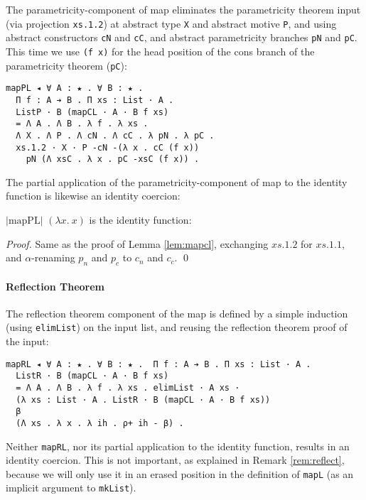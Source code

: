 \documentclass[a4paper,envcountsame,envcountsect]{llncs}
\newcommand{\refrem}[1]{Remark \ref{rem:#1}}
\newcommand{\reflem}[1]{Lemma \ref{lem:#1}}
\newcommand{\lablem}[1]{\label{lem:#1}}
\newcommand{\earg}[1]{\,\,#1}
\newcommand{\erase}[1]{\ensuremath{\lvert #1 \rvert}}
\newcommand{\fun}[1]{\lambda #1 .~}
\newcommand{\name}[1]{\textrm{#1}}
\begin{document}
The parametricity-component of map eliminates the parametricity theorem input
(via projection \texttt{xs.1.2}) at abstract type \texttt{X} and
abstract motive \texttt{P}, and using abstract constructors \texttt{cN} and
\texttt{cC}, and abstract parametricity branches \texttt{pN} and
\texttt{pC}. This time we use \texttt{(f x)} for the head position of
the cons branch of the parametricity theorem (\texttt{pC}):

\begin{verbatim}
mapPL ◂ ∀ A : ★ . ∀ B : ★ .
  Π f : A ➔ B . Π xs : List · A .
  ListP · B (mapCL · A · B f xs)
  = Λ A . Λ B . λ f . λ xs .
  Λ X . Λ P . Λ cN . Λ cC . λ pN . λ pC .
  xs.1.2 · X · P -cN -(λ x . cC (f x))
    pN (Λ xsC . λ x . pC -xsC (f x)) .
\end{verbatim}

The partial application of the parametricity-component of map to the
identity function is likewise an identity coercion:

\begin{lemma}
$\erase{\name{mapPL}} \earg (\fun{x}{x})$ is the identity function:
\lablem{mappl}
\end{lemma}

\begin{proof}
{\small
  Same as the proof of \reflem{mapcl}, exchanging
  $xs.1.2$ for $xs.1.1$, and $\alpha$-renaming
  $p_n$ and $p_c$ to $c_n$ and $c_c$. \qed
}
\end{proof}

\paragraph{Reflection Theorem}

The reflection theorem component of the map is defined by a simple
induction (using \texttt{elimList}) on the input list, and reusing the
reflection theorem proof of the input:

\begin{verbatim}
mapRL ◂ ∀ A : ★ . ∀ B : ★ .  Π f : A ➔ B . Π xs : List · A .
  ListR · B (mapCL · A · B f xs)
  = Λ A . Λ B . λ f . λ xs . elimList · A xs ·
  (λ xs : List · A . ListR · B (mapCL · A · B f xs))
  β
  (Λ xs . λ x . λ ih . ρ+ ih - β) . 
\end{verbatim}

\begin{remark}
Neither \texttt{mapRL}, nor its partial application to the identity
function, results in an identity coercion. This is not important, as
explained in \refrem{reflect}, because we will only use it in an
erased position in the definition of \texttt{mapL} (as an implicit
argument to \texttt{mkList}).
\end{remark}
\end{document}

